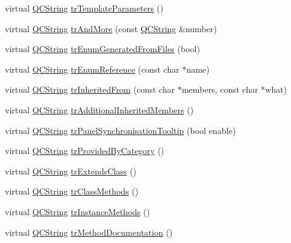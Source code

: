 \begin{DoxyCompactItemize}
\item 
virtual \mbox{\hyperlink{class_q_c_string}{Q\+C\+String}} \mbox{\hyperlink{class_translator_chinese_a96ac34d4daa866df229b70296b424a6b}{tr\+Template\+Parameters}} ()
\item 
virtual \mbox{\hyperlink{class_q_c_string}{Q\+C\+String}} \mbox{\hyperlink{class_translator_chinese_a2fe16181d57a63bf65b59900e92dd434}{tr\+And\+More}} (const \mbox{\hyperlink{class_q_c_string}{Q\+C\+String}} \&number)
\item 
virtual \mbox{\hyperlink{class_q_c_string}{Q\+C\+String}} \mbox{\hyperlink{class_translator_chinese_aee5fca73a548ac964fc4869d5915ff10}{tr\+Enum\+Generated\+From\+Files}} (bool)
\item 
virtual \mbox{\hyperlink{class_q_c_string}{Q\+C\+String}} \mbox{\hyperlink{class_translator_chinese_ac41690f621caef07e515d2cd8e58392e}{tr\+Enum\+Reference}} (const char $\ast$name)
\item 
virtual \mbox{\hyperlink{class_q_c_string}{Q\+C\+String}} \mbox{\hyperlink{class_translator_chinese_a595215852c20040eca3c8e890f986da1}{tr\+Inherited\+From}} (const char $\ast$members, const char $\ast$what)
\item 
virtual \mbox{\hyperlink{class_q_c_string}{Q\+C\+String}} \mbox{\hyperlink{class_translator_chinese_a2bfe5184a9fd92092081ef544ea865f5}{tr\+Additional\+Inherited\+Members}} ()
\item 
virtual \mbox{\hyperlink{class_q_c_string}{Q\+C\+String}} \mbox{\hyperlink{class_translator_chinese_ac0e145118fc0ac65316ba3547e4ed37d}{tr\+Panel\+Synchronisation\+Tooltip}} (bool enable)
\item 
virtual \mbox{\hyperlink{class_q_c_string}{Q\+C\+String}} \mbox{\hyperlink{class_translator_chinese_ad1e9618be697dab51459a24003fcdfe1}{tr\+Provided\+By\+Category}} ()
\item 
virtual \mbox{\hyperlink{class_q_c_string}{Q\+C\+String}} \mbox{\hyperlink{class_translator_chinese_a6d67b6a3dc10862a8a5af714354a9bcc}{tr\+Extends\+Class}} ()
\item 
virtual \mbox{\hyperlink{class_q_c_string}{Q\+C\+String}} \mbox{\hyperlink{class_translator_chinese_a2b81bbee1f1b49666e5695cdd26dcfdd}{tr\+Class\+Methods}} ()
\item 
virtual \mbox{\hyperlink{class_q_c_string}{Q\+C\+String}} \mbox{\hyperlink{class_translator_chinese_aa16824b1d5d30feeae80382d3ec01875}{tr\+Instance\+Methods}} ()
\item 
virtual \mbox{\hyperlink{class_q_c_string}{Q\+C\+String}} \mbox{\hyperlink{class_translator_chinese_ac3ee296ad407edff306f6a219941f865}{tr\+Method\+Documentation}} ()

\end{DoxyCompactItemize}
